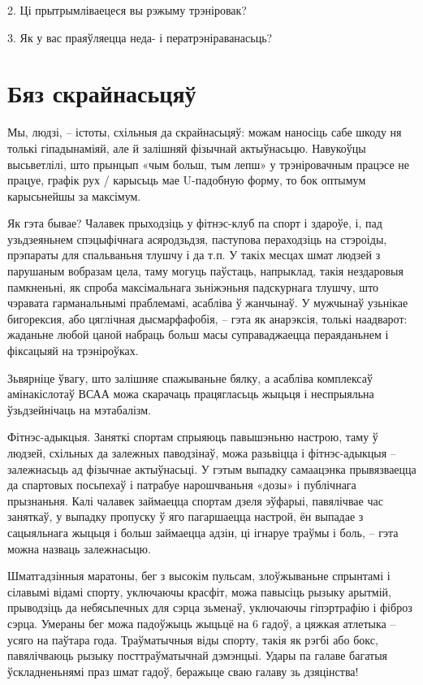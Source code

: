 2. Ці прытрымліваецеся вы рэжыму трэніровак?

3. Як у вас праяўляецца неда- і ператрэніраванасьць?


\section{Бяз скрайнасьцяў}

Мы, людзі, – істоты, схільныя да скрайнасьцяў: можам наносіць сабе шкоду ня толькі гіпадынаміяй, але й залішняй фізычнай актыўнасьцю. Навукоўцы высьветлілі, што прынцып «чым больш, тым лепш» у трэніровачным працэсе не працуе, графік рух / карысьць мае U-падобную форму, то бок оптымум карысьнейшы за максімум.

Як гэта бывае? Чалавек прыходзіць у фітнэс-клуб па спорт і здароўе, і, пад узьдзеяньнем спэцыфічнага асяродзьдзя, паступова пераходзіць на стэроіды, прэпараты для спальваньня тлушчу і да т.п. У такіх месцах шмат людзей з парушаным вобразам цела, таму могуць паўстаць, напрыклад, такія нездаровыя памкненьні, як спроба максімальнага зьніжэньня падскурнага тлушчу, што чэравата гарманальнымі праблемамі, асабліва ў жанчынаў. У мужчынаў узьнікае бигорексия, або цяглічная дысмарфафобія, – гэта як анарэксія, толькі наадварот: жаданьне любой цаной набраць больш масы суправаджаецца пераяданьнем і фіксацыяй на трэніроўках.

Зьвярніце ўвагу, што залішняе спажываньне бялку, а асабліва комплексаў амінакіслотаў ВСАА можа скарачаць працягласьць жыцьця і неспрыяльна ўзьдзейнічаць на мэтабалізм.

Фітнэс-адыкцыя. Заняткі спортам спрыяюць павышэньню настрою, таму ў людзей, схільных да залежных паводзінаў, можа разьвіцца і фітнэс-адыкцыя – залежнасьць ад фізычнае актыўнасьці. У гэтым выпадку самаацэнка прывязваецца да спартовых посьпехаў і патрабуе нарошчваньня «дозы» і публічнага прызнаньня. Калі чалавек займаецца спортам дзеля эўфарыі, павялічвае час заняткаў, у выпадку пропуску ў яго пагаршаецца настрой, ён выпадае з сацыяльнага жыцьця і больш займаецца адзін, ці ігнаруе траўмы і боль, – гэта можна назваць залежнасьцю.

Шматгадзінныя маратоны, бег з высокім пульсам, злоўжываньне спрынтамі і сілавымі відамі спорту, уключаючы красфіт, можа павысіць рызыку арытмій, прыводзіць да небясьпечных для сэрца зьменаў, уключаючы гіпэртрафію і фіброз сэрца. Умераны бег можа падоўжыць жыцьцё на 6 гадоў, а цяжкая атлетыка – усяго на паўтара года. Траўматычныя віды спорту, такія як рэгбі або бокс, павялічваюць рызыку посттраўматычнай дэмэнцыі. Удары па галаве багатыя ўскладненьнямі праз шмат гадоў, беражыце сваю галаву зь дзяцінства!

